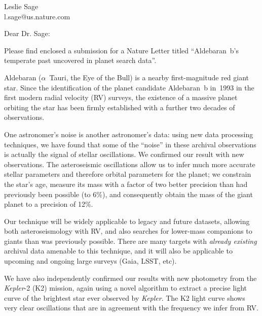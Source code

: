 \documentclass{letter}
\begin{document}
\signature{Will Farr}

\address{Will M. Farr\\School of Physics and Astronomy\\University of Birmingham\\Birmingham\\B15 2TT\\United Kingdom}

\begin{letter}
{Leslie Sage \\
l.sage@us.nature.com \\}

\opening{Dear Dr. Sage:}

Please find enclosed a submission for a Nature Letter titled ``Aldebaran~b's
temperate past uncovered in planet search data''.

Aldebaran ($\alpha$~Tauri, the Eye of the Bull) is a nearby first-magnitude red
giant star. Since the identification of the planet candidate Aldebaran~b in~1993
in the first modern radial velocity (RV) surveys, the existence of a massive
planet orbiting the star has been firmly established with a further two decades
of observations.

One astronomer's noise is another astronomer's data: using new data processing
techniques, we have found that some of the ``noise'' in these archival
observations is actually the signal of stellar oscillations. We confirmed our
result with new observations. The asteroseismic oscillations allow us to infer
much more accurate stellar parameters and therefore orbital parameters for the
planet; we constrain the star's age, measure its mass with a factor of two
better precision than had previously been possible (to 6\%), and consequently
obtain the mass of the giant planet to a precision of 12\%.

Our technique will be widely applicable to legacy and future datasets, allowing
both asteroseismology with RV, and also searches for lower-mass companions to
giants than was previously possible.  There are many targets with \emph{already
existing} archival data amenable to this technique, and it will also be
applicable to upcoming and ongoing large surveys (Gaia, LSST, etc).

We have also independently confirmed our results with new photometry from the
\emph{Kepler}-2 (K2) mission, again using a novel algorithm to extract a precise
light curve of the brightest star ever observed by \emph{Kepler}. The K2 light
curve shows very clear oscillations that are in agreement with the frequency we
infer from RV.


\end{letter}
\end{document}
